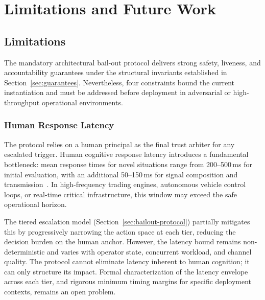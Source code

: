 
\section{Limitations and Future Work}

\subsection{Limitations}

The mandatory architectural bail-out protocol delivers strong safety, liveness, and
accountability guarantees under the structural invariants established in
Section~\ref{sec:guarantees}.  Nevertheless, four constraints bound the current
instantiation and must be addressed before deployment in adversarial or
high-throughput operational environments.

\subsubsection{Human Response Latency}

The protocol relies on a human principal as the final trust arbiter for any
escalated trigger.  Human cognitive response latency introduces a fundamental
bottleneck: mean response times for novel situations range from 200--500\,ms for
initial evaluation, with an additional 50--150\,ms for signal composition and
transmission~\cite{card1980psychology}.  In high-frequency trading engines,
autonomous vehicle control loops, or real-time critical infrastructure, this
window may exceed the safe operational horizon.

The tiered escalation model (Section~\ref{sec:bailout-protocol}) partially
mitigates this by progressively narrowing the action space at each tier, reducing
the decision burden on the human anchor.  However, the latency bound remains
non-deterministic and varies with operator state, concurrent workload, and
channel quality.  The protocol cannot eliminate latency inherent to human
cognition; it can only structure its impact.  Formal characterization of the
latency envelope across each tier, and rigorous minimum timing margins for
specific deployment contexts, remains an open problem.

